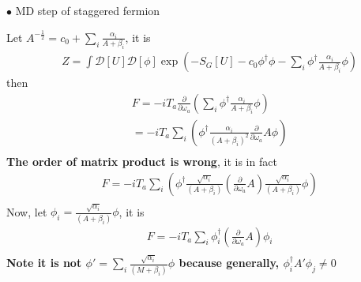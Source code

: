 $\bullet$ MD step of staggered fermion

Let $A^{-\frac{1}{2}}=c_0+\sum _i \frac{\alpha _i }{A+\beta _i} $, it is
\begin{equation}
\begin{split}
&Z=\int \mathcal{D}[U]  \mathcal {D}[\phi]\exp \left(-S_G[U]-c_0\phi ^{\dagger} \phi -\sum_i \phi ^{\dagger}\frac{\alpha _i }{A+\beta _i} \phi\right)
\end{split}
\end{equation}
then
\begin{equation}
\begin{split}
&F=-iT_a \frac{\partial }{\partial \omega _a}\left(\sum_i \phi ^{\dagger}\frac{\alpha _i }{A+\beta _i} \phi\right)\\
&=-iT_a \sum_i \left(\phi ^{\dagger}\frac{\alpha _i }{(A+\beta _i)^2} \frac{\partial }{\partial \omega _a} A \phi\right)\\
\end{split}
\end{equation}
\textbf{The order of matrix product is wrong}, it is in fact
\begin{equation}
\begin{split}
&F=-iT_a \sum_i \left(\phi ^{\dagger}\frac{\sqrt{\alpha _i} }{(A+\beta _i)} \left(\frac{\partial }{\partial \omega _a} A \right) \frac{\sqrt{\alpha _i} }{(A+\beta _i)} \phi\right)\\
\end{split}
\end{equation}
Now, let $\phi _{i} =  \frac{\sqrt{\alpha _i} }{(A+\beta _i)} \phi$, it is
\begin{equation}
\begin{split}
&F=-iT_a \sum _i \phi _{i}^{\dagger} \left(\frac{\partial }{\partial \omega _a} A \right) \phi _{i}\\
\end{split}
\end{equation}
\textbf{Note it is not $\phi ' =  \sum _i \frac{\sqrt{\alpha _i} }{(M+\beta _i)} \phi$ because generally, $\phi _{i}^{\dagger} A' \phi _{j} \neq 0$}

